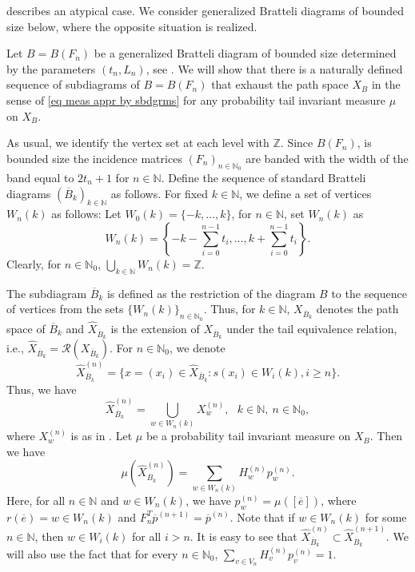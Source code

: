 \documentclass[11pt,reqno]{amsart}
\theoremstyle{definition}
\theoremstyle{remark}
\theoremstyle{plain}
\def\ol{\overline}
\def\ov{\overline}
\def\wh{\widehat}
\newcommand{\N}{\mathbb N}
\newcommand{\Z}{\mathbb Z}
\numberwithin{equation}{section}
\begin{document}
 describes an atypical case. 
We consider generalized Bratteli diagrams of bounded size below, where the opposite situation is realized.

Let $B = B(F_n)$ 
be a generalized Bratteli diagram of bounded size determined by the parameters $(t_n, L_n)$, see . We will show that there is a naturally defined sequence of subdiagrams of $B = B(F_n)$ that exhaust the path space $X_{B}$  in the sense of \eqref{eq meas appr by sbdgrms} for any probability tail invariant measure $\mu$ on $X_{B}$.

As usual, we identify the vertex set at each level with $\Z$. Since $B(F_n)$, is bounded size the incidence matrices $(F_n)_{n \in \N_0}$ are banded with the width of the band equal to $2t_n +1$ for $n \in \N$. Define the sequence of standard Bratteli diagrams $(\ol B_k)_{k \in \N}$ as follows. For fixed $k \in \N$, 
we define a set of vertices $W_n(k)$ as follows: Let $W_0(k) = \{-k, \ldots, k\}$, for $n \in \N$, set $W_n(k)$ as
\begin{equation}\label{eq: wnk}
    W_n(k) = \left\{-k - \sum_{i=0}^{n-1} t_i,\ldots,  k + 
    \sum_{i=0}^{n-1} t_i\right\}.
\end{equation}
Clearly, for $n \in \N_0$, $\bigcup_{k\in \N} W_n(k) = \Z $. 

The subdiagram $\ov{B}_k$ is defined as the restriction of the diagram $B$ to the sequence of vertices from the sets $\{W_n(k)\}_{n \in \N_0}$. Thus, for $k \in \N$, $X_{\ov{B}_k}$ denotes the path space of $\ov{B}_k$ and
$\wh{X}_{\ov{B}_k}$ is the extension of $X_{\ov{B}_k}$ under the tail equivalence relation, i.e., $\wh{X}_{\ov{B}_k} = \mathcal{R} (X_{\ov{B}_k})$. For $n \in \N_0$, 
we denote
\[
\wh{X}^{(n)}_{\ov{B}_k} = \{x = (x_i) \in \wh{X}_{\ov{B}_k} : s(x_i) \in W_{i}(k), i \geq n\}. 
\]
Thus, we have
\[
\wh{X}^{(n)}_{\ov{B}_k} = \underset{w \in W_n(k)}{\bigcup} X_w^{(n)}, \ \ \  k \in \N,\  n \in \N_0,
\] 
where $X_w^{(n)}$ is as in . Let $\mu$ be a probability tail invariant measure on $X_B$. Then 
we have
\begin{equation}\label{eq:measure_whX}
    \mu(\wh{X}^{(n)}_{\ov{B}_k}) = \underset{w \in W_n(k)}{\sum} H_w^{(n)}p_w^{(n)}.
\end{equation} 
Here, for all $n \in \N$ and $w \in W_n(k)$, we have $p_w^{(n)} = \mu( [\ov{e}])$, where $r(\ov{e}) = w\in W_n(k) $ and 
$F_n^{T} \ov{p}^{(n+1)} =\ov{p}^{(n)}$. Note that if $w \in W_n(k)$ for some $n \in \N$, then $w \in W_i(k)$ for all $i>n$. 
It is easy to see that
$\wh{X}^{(n)}_{\ov{B}_k} \subset \wh{X}^{(n+1)}_{\ov{B}_k}$. We will also use the fact that for every $n\in \N_0$, $\underset{v \in V_n}{\sum} H_v^{(n)}p_v^{(n)} = 1$.
\end{document}
